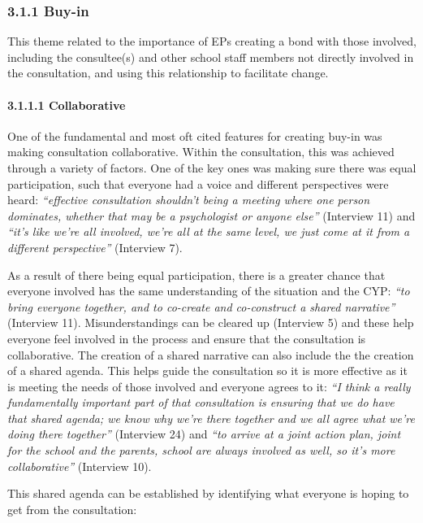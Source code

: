 \documentclass[
]{article}
\begin{document}
\hypertarget{buy-in}{%
\subsubsection{3.1.1 Buy-in}\label{buy-in}}

This theme related to the importance of EPs creating a bond with those
involved, including the consultee(s) and other school staff members not
directly involved in the consultation, and using this relationship to
facilitate change.

\hypertarget{collaborative}{%
\paragraph{3.1.1.1 Collaborative}\label{collaborative}}

One of the fundamental and most oft cited features for creating buy-in
was making consultation collaborative. Within the consultation, this was
achieved through a variety of factors. One of the key ones was making
sure there was equal participation, such that everyone had a voice and
different perspectives were heard: \emph{``effective consultation
shouldn't being a meeting where one person dominates, whether that may
be a psychologist or anyone else''} (Interview 11) and \emph{``it's like
we're all involved, we're all at the same level, we just come at it from
a different perspective''} (Interview 7).

As a result of there being equal participation, there is a greater
chance that everyone involved has the same understanding of the
situation and the CYP: \emph{``to bring everyone together, and to
co-create and co-construct a shared narrative''} (Interview 11).
Misunderstandings can be cleared up (Interview 5) and these help
everyone feel involved in the process and ensure that the consultation
is collaborative. The creation of a shared narrative can also include
the the creation of a shared agenda. This helps guide the consultation
so it is more effective as it is meeting the needs of those involved and
everyone agrees to it: \emph{``I think a really fundamentally important
part of that consultation is ensuring that we do have that shared
agenda; we know why we're there together and we all agree what we're
doing there together''} (Interview 24) and \emph{``to arrive at a joint
action plan, joint for the school and the parents, school are always
involved as well, so it's more collaborative''} (Interview 10).

This shared agenda can be established by identifying what everyone is
hoping to get from the consultation:
\end{document}
